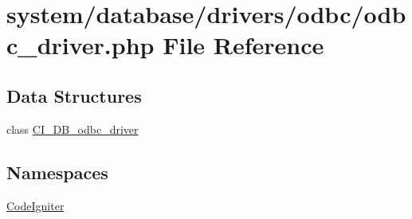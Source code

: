 \hypertarget{odbc__driver_8php}{\section{system/database/drivers/odbc/odbc\-\_\-driver.php File Reference}
\label{odbc__driver_8php}
}
\subsection*{Data Structures}
\begin{DoxyCompactItemize}
\item 
class \hyperlink{class_c_i___d_b__odbc__driver}{C\-I\-\_\-\-D\-B\-\_\-odbc\-\_\-driver}
\end{DoxyCompactItemize}
\subsection*{Namespaces}
\begin{DoxyCompactItemize}
\item 
\hyperlink{namespace_code_igniter}{Code\-Igniter}
\end{DoxyCompactItemize}
